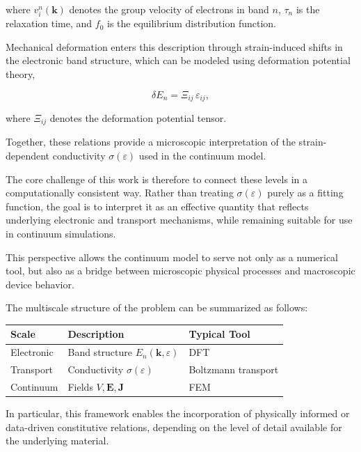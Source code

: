 where $v_i^n(\mathbf{k})$ denotes the group velocity of electrons in band $n$, $\tau_n$ is the relaxation time, 
and $f_0$ is the equilibrium distribution function.

Mechanical deformation enters this description through strain-induced shifts in the electronic band structure, 
which can be modeled using deformation potential theory,

\begin{equation}
\delta E_n = \Xi_{ij}\,\varepsilon_{ij},
\end{equation}

where $\Xi_{ij}$ denotes the deformation potential tensor.

Together, these relations provide a microscopic interpretation of the strain-dependent conductivity $\sigma(\varepsilon)$ 
used in the continuum model.

The core challenge of this work is therefore to connect these levels in a computationally consistent way. 
Rather than treating $\sigma(\varepsilon)$ purely as a fitting function, the goal is to interpret it as an effective quantity 
that reflects underlying electronic and transport mechanisms, while remaining suitable for use in continuum simulations.

This perspective allows the continuum model to serve not only as a numerical tool, but also as a bridge between 
microscopic physical processes and macroscopic device behavior.

The multiscale structure of the problem can be summarized as follows:

\begin{center}
\begin{tabular}{lll}
\textbf{Scale} & \textbf{Description} & \textbf{Typical Tool} \\
\hline
Electronic & Band structure $E_n(\mathbf{k}, \varepsilon)$ & DFT  \\
Transport  & Conductivity $\sigma(\varepsilon)$ & Boltzmann transport \\
Continuum  & Fields $V, \mathbf{E}, \mathbf{J}$ & FEM \\
\end{tabular}
\end{center}

In particular, this framework enables the incorporation of physically informed or data-driven constitutive relations, depending on the level of detail available for the underlying material.